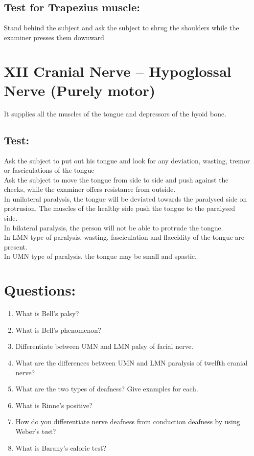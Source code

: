 \documentclass[a4paper,12pt,openany,oneside]{book}
\begin{document}
\subsection*{Test for Trapezius muscle:}
Stand behind the subject and ask the subject to shrug the shoulders while the examiner presses them downward

\section*{XII Cranial Nerve – Hypoglossal Nerve (Purely motor)}

	It supplies all the muscles of the tongue and depressors of the hyoid bone.
\subsection*{Test:}
Ask the subject to put out his tongue and look for any deviation, wasting, tremor or fasciculations of the tongue\\
Ask the subject to move the tongue from side to side and push against the cheeks, while the examiner offers resistance from outside.\\
In unilateral paralysis, the tongue will be deviated towards the paralysed side on protrusion. The muscles of the healthy side push the tongue to the paralysed side.\\
In bilateral paralysis, the person will not be able to protrude the tongue.\\
In LMN type of paralysis, wasting, fasciculation and flaccidity of the tongue are present.\\
In UMN type of paralysis, the tongue may be small and spastic.

\section*{Questions:}
\begin{enumerate}
\item{ What is Bell’s palsy?}
\item{ What is Bell’s phenomenon?}
\item{ Differentiate between UMN and LMN palsy of facial nerve.}
\item{ What are the differences between UMN and LMN paralysis of twelfth cranial nerve?}
\item{ What are the two types of deafness? Give examples for each.}
\item{ What is Rinne’s positive?}
\item{ How do you differentiate nerve deafness from conduction deafness by using Weber’s test?}
\item{ What is Barany’s caloric test?}
\end{enumerate}
	
\end{document}
